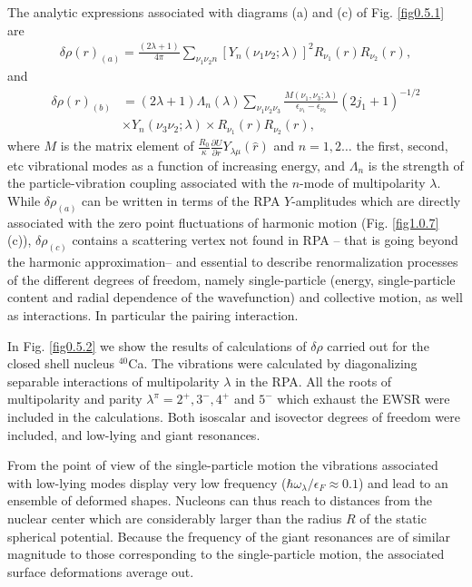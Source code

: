 \documentclass[a4paper,11pt]{book}
\numberwithin{equation}{section}
\numberwithin{figure}{section}
\numberwithin{table}{section}
\begin{document}
The analytic expressions associated with diagrams (a) and (c) of Fig. \ref{fig0.5.1} are 
\begin{align}\label{eq0.1.127}
\delta\rho(r)_{(a)}=\frac{(2\lambda+1)}{4\pi}\sum_{\nu_1\nu_2 n}\left[Y_n(\nu_1\nu_2;\lambda)\right]^2 R_{\nu_1}(r)R_{\nu_2}(r),
\end{align}
and
\begin{align}\label{eq0.1.128}
\nonumber \delta\rho(r)_{(b)}&=(2\lambda+1)\Lambda_n(\lambda)\sum_{\nu_1\nu_2\nu_3}\frac{M(\nu_1,\nu_3;\lambda)}{\epsilon_{\nu_1}-\epsilon_{\nu_2}}(2j_1+1)^{-1/2}\\&\times Y_n(\nu_3\nu_2;\lambda)\times R_{\nu_1}(r)R_{\nu_2}(r),
\end{align}
where $M$ is the matrix element of $\frac{R_0}{\kappa}\frac{\partial U}{\partial r}Y_{\lambda\mu}(\hat r)$ and $n=1,2\dots$ the first, second, etc vibrational modes as a function of increasing energy, and $\Lambda_n$ is the strength of the particle-vibration coupling associated with the $n$-mode of multipolarity $\lambda$. While $\delta\rho_{(a)}$ can be written in terms of the RPA $Y$-amplitudes which are directly associated with the zero point fluctuations of harmonic motion (Fig. \ref{fig1.0.7} (c)), $\delta\rho_{(c)}$ contains a scattering vertex not found in RPA -- that is going beyond the harmonic approximation-- and essential to describe renormalization processes of the different degrees of freedom, namely single-particle (energy, single-particle content and radial dependence of the wavefunction) and collective motion, as well as interactions. In particular the pairing interaction. 

In Fig. \ref{fig0.5.2} we show the results of calculations of $\delta\rho$ carried out for the closed shell nucleus $^{40}$Ca. The vibrations were calculated by diagonalizing separable interactions of multipolarity $\lambda$ in the RPA. All the roots of multipolarity and parity $\lambda^\pi=2^+,3^-,4^+$ and $5^-$ which exhaust the EWSR were included in the calculations. Both isoscalar and isovector degrees of freedom were included, and low-lying and giant resonances.

From the point of view of the single-particle motion the vibrations associated with low-lying modes display very low frequency ($\hbar\omega_\lambda/\epsilon_F\approx0.1$) and lead to an ensemble of deformed shapes. Nucleons can thus reach to distances from the nuclear center which are considerably larger than the radius $R$ of the static spherical potential. Because the frequency of the giant resonances are of similar magnitude to those corresponding to the single-particle motion, the associated surface deformations average out. 
\end{document}
